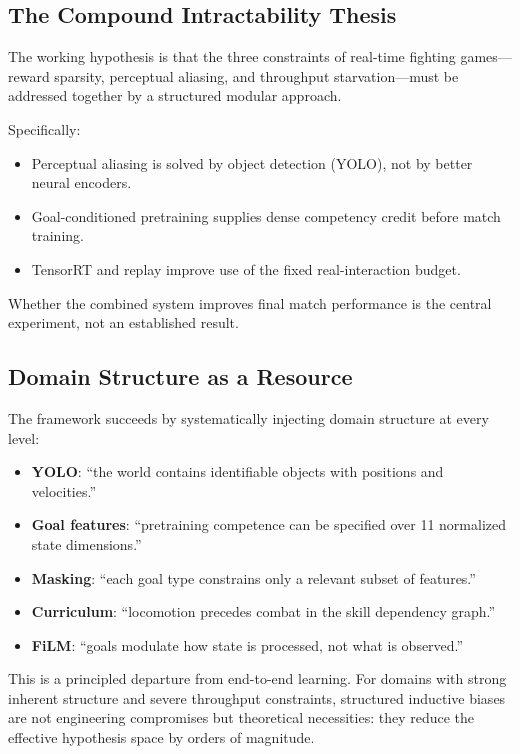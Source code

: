 \documentclass[11pt,a4paper]{article}
\begin{document}
\subsection{The Compound Intractability Thesis}

The working hypothesis is that the three constraints of real-time fighting games---reward sparsity, perceptual aliasing, and throughput starvation---must be addressed together by a structured modular approach.

Specifically:
\begin{itemize}[leftmargin=1.5em]
    \item Perceptual aliasing is solved by object detection (YOLO), not by better neural encoders.
    \item Goal-conditioned pretraining supplies dense competency credit before match training.
    \item TensorRT and replay improve use of the fixed real-interaction budget.
\end{itemize}
Whether the combined system improves final match performance is the central experiment, not an established result.

\subsection{Domain Structure as a Resource}

The framework succeeds by systematically injecting domain structure at every level:
\begin{itemize}[leftmargin=1.5em]
    \item \textbf{YOLO}: ``the world contains identifiable objects with positions and velocities.''
    \item \textbf{Goal features}: ``pretraining competence can be specified over 11 normalized state dimensions.''
    \item \textbf{Masking}: ``each goal type constrains only a relevant subset of features.''
    \item \textbf{Curriculum}: ``locomotion precedes combat in the skill dependency graph.''
    \item \textbf{FiLM}: ``goals modulate how state is processed, not what is observed.''
\end{itemize}

This is a principled departure from end-to-end learning.
For domains with strong inherent structure and severe throughput constraints, structured inductive biases are not engineering compromises but theoretical necessities: they reduce the effective hypothesis space by orders of magnitude.
\end{document}
